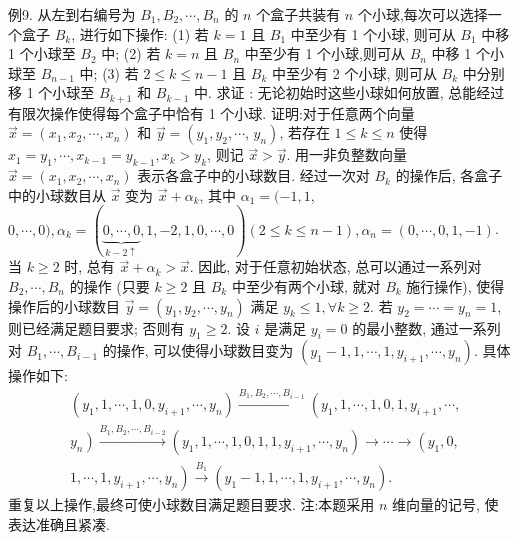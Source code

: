 例9. 从左到右编号为 $B_1, B_2, \cdots, B_n$ 的 $n$ 个盒子共装有 $n$ 个小球,每次可以选择一个盒子 $B_k$, 进行如下操作: (1) 若 $k=1$ 且 $B_1$ 中至少有 1 个小球, 则可从 $B_1$ 中移 1 个小球至 $B_2$ 中; (2) 若 $k=n$ 且 $B_n$ 中至少有 1 个小球,则可从 $B_n$ 中移 1 个小球至 $B_{n-1}$ 中; (3) 若 $2 \leqslant k \leqslant n-1$ 且 $B_k$ 中至少有 2 个小球, 则可从 $B_k$ 中分别移 1 个小球至 $B_{k+1}$ 和 $B_{k-1}$ 中.
求证 : 无论初始时这些小球如何放置, 总能经过有限次操作使得每个盒子中恰有 1 个小球.
证明:对于任意两个向量 $\vec{x}=\left(x_1, x_2, \cdots, x_n\right)$ 和 $\vec{y}=\left(y_1, y_2, \cdots\right.$, $\left.y_n\right)$, 若存在 $1 \leqslant k \leqslant n$ 使得 $x_1=y_1, \cdots, x_{k-1}=y_{k-1}, x_k>y_k$, 则记 $\vec{x}>\vec{y}$. 用一非负整数向量 $\vec{x}=\left(x_1, x_2, \cdots, x_n\right)$ 表示各盒子中的小球数目.
经过一次对 $B_k$ 的操作后, 各盒子中的小球数目从 $\vec{x}$ 变为 $\vec{x}+\alpha_k$, 其中 $\alpha_1=(-1,1$, $0, \cdots, 0), \alpha_k=(\underbrace{0, \cdots, 0}_{k-2 \uparrow}, 1,-2,1,0, \cdots, 0)(2 \leqslant k \leqslant n-1), \alpha_n= (0, \cdots, 0,1,-1)$. 当 $k \geqslant 2$ 时, 总有 $\vec{x}+\alpha_k>\vec{x}$. 因此, 对于任意初始状态, 总可以通过一系列对 $B_2, \cdots, B_n$ 的操作 (只要 $k \geqslant 2$ 且 $B_k$ 中至少有两个小球, 就对 $B_k$ 施行操作), 使得操作后的小球数目 $\vec{y}=\left(y_1, y_2, \cdots, y_n\right)$ 满足 $y_k \leqslant 1, \forall k \geqslant 2$. 若 $y_2=\cdots=y_n=1$, 则已经满足题目要求; 否则有 $y_1 \geqslant 2$. 设 $i$ 是满足 $y_i=0$ 的最小整数, 通过一系列对 $B_1, \cdots, B_{i-1}$ 的操作, 可以使得小球数目变为 $\left(y_1-1,1, \cdots, 1, y_{i+1}, \cdots, y_n\right)$. 具体操作如下:
$$
\begin{aligned}
& \left(y_1, 1, \cdots, 1,0, y_{i+1}, \cdots, y_n\right) \stackrel{B_1, B_2, \cdots, B_{i-1}}{\longrightarrow}\left(y_1, 1, \cdots, 1,0,1, y_{i+1}, \cdots,\right. \\
& \left.y_n\right) \stackrel{B_1, B_2, \cdots, B_{i-2}}{\longrightarrow}\left(y_1, 1, \cdots, 1,0,1,1, y_{i+1}, \cdots, y_n\right) \rightarrow \cdots \rightarrow\left(y_1, 0,\right. \\
& \left.1, \cdots, 1, y_{i+1}, \cdots, y_n\right) \stackrel{B_1}{\longrightarrow}\left(y_1-1,1, \cdots, 1, y_{i+1}, \cdots, y_n\right) .
\end{aligned}
$$
重复以上操作,最终可使小球数目满足题目要求.
注:本题采用 $n$ 维向量的记号, 使表达准确且紧凑.


